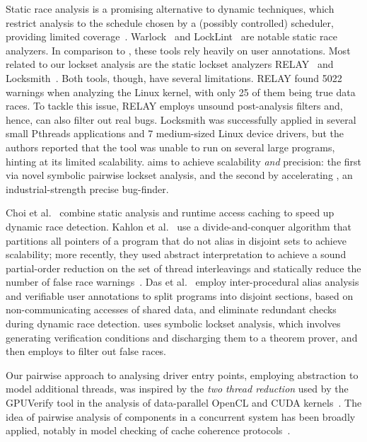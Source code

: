 Static race analysis is a promising alternative to dynamic techniques, which restrict analysis to the schedule chosen by a (possibly controlled) scheduler, providing limited coverage~\cite{musuvathi2008finding}. Warlock~\cite{sterling1993warlock} and LockLint~\cite{oracle2010locklint} are notable static race analyzers.  In comparison to \whoop, these tools rely heavily on user annotations.
%
Most related to our lockset analysis are the static lockset analyzers RELAY~\cite{voung2007relay} and Locksmith~\cite{pratikakis2006locksmith}. Both tools, though, have several limitations. RELAY found 5022 warnings when analyzing the Linux kernel, with only 25 of them being true data races. To tackle this issue, RELAY employs unsound post-analysis filters and, hence, can also filter out real bugs. Locksmith was successfully applied in several small Pthreads applications and 7 medium-sized Linux device drivers, but the authors reported that the tool was unable to run on several large programs, hinting at its limited scalability. \whoop aims to achieve scalability \emph{and} precision: the first via novel symbolic pairwise lockset analysis, and the second by accelerating \corral, an industrial-strength precise bug-finder.

Choi et al.~\cite{choi2002efficient} combine static analysis and runtime access caching to speed up dynamic race detection. Kahlon et al.~\cite{kahlon2007fast} use a divide-and-conquer algorithm that partitions all pointers of a program that do not alias in disjoint sets to achieve scalability; more recently, they used abstract interpretation to achieve a sound partial-order reduction on the set of thread interleavings and statically reduce the number of false race warnings~\cite{kahlon2009semantic}. Das et al.~\cite{das2015section} employ inter-procedural alias analysis and verifiable user annotations to split programs into disjoint sections, based on non-communicating accesses of shared data, and eliminate redundant checks during dynamic race detection. \whoop uses symbolic lockset analysis, which involves generating verification conditions and discharging them to a theorem prover, and then employs \corral to filter out false races. 

Our pairwise approach to analysing driver entry points, employing abstraction to model additional threads, was inspired by the \emph{two thread reduction} used by the GPUVerify tool in the analysis of data-parallel OpenCL and CUDA kernels~\cite{gpuverify,bardsley2014engineering}.  The idea of pairwise analysis of components in a concurrent system has been broadly applied, notably in model checking of cache coherence protocols~\cite{mcmillan1999verification}.
